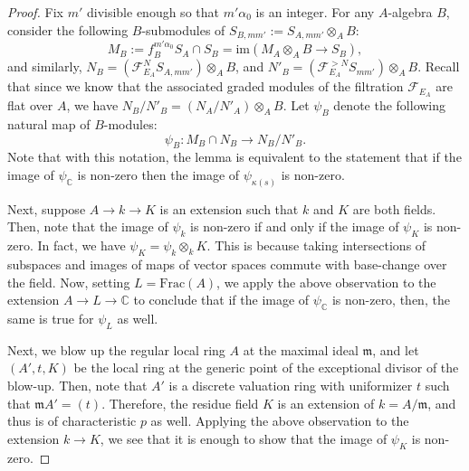 \documentclass[11pt,reqno]{amsart}
\newcommand{\C}{\mathbb{C}}
\newcommand{\cF}{\mathcal{F}}
\newcommand{\fm}{\mathfrak{m}}
\numberwithin{equation}{section}
\theoremstyle{definition}
\begin{document}
\begin{proof}
    Fix $m'$ divisible enough so that $m' \alpha_0$ is an integer. For any $A$-algebra $B$,  consider the following $B$-submodules of $ S_{B, mm'} := S_{A, mm'} \otimes_A B$:
    \[ M_B := f_B ^{m' \alpha_0} S_A \cap S_B = \text{im} (M_A \otimes_A B \to S_B),\]
    and similarly,
    $N_B = (\cF ^{N } _{E_A} S_{A, mm'}) \otimes _A B$, and $N'_B = (\cF _{E_A} ^{> N } S_{mm'}) \otimes_A B$. Recall that since we know that the associated graded modules of the filtration $\cF_{E_A}$ are flat over $A$, we have $N_B/N'_B = (N_A/N'_A) \otimes_A B$. Let $\psi_B$ denote the following natural map of $B$-modules:
    \[ \psi_B: M_B \cap N_B \to N_B/N'_ B. \]
    Note that with this notation, the lemma is equivalent to the statement that if the image of $\psi_ \C$ is non-zero then the image of $\psi _{\kappa(s)}$ is non-zero.

    Next, suppose $A \to k \to K$ is an extension such that $k$ and $K$ are both fields. Then, note that the image of $\psi_k$ is non-zero if and only if the image of $\psi_K$ is non-zero. In fact, we have $\psi_K = \psi_k \otimes _k K$. This is because taking intersections of subspaces and images of maps of vector spaces commute with base-change over the field. Now, setting $L = \text{Frac}(A)$, we apply the above observation to the extension $A \to L \to \C$ to conclude that if the image of $\psi_\C$ is non-zero, then, the same is true for $\psi_L$ as well.
    
    Next, we blow up the regular local ring $A$ at the maximal ideal $\fm$, and let $(A', t, K)$ be the local ring at the generic point of the exceptional divisor of the blow-up. Then, note that $A'$ is a discrete valuation ring with uniformizer $t$ such that $\fm A' = (t)$. Therefore, the residue field $K$ is an extension of $k = A/\fm$, and thus is of characteristic $p$ as well. Applying the above observation to the extension $k \to K$, we see that it is enough to show that the image of $\psi_K$ is non-zero.


\end{proof}
\end{document}
